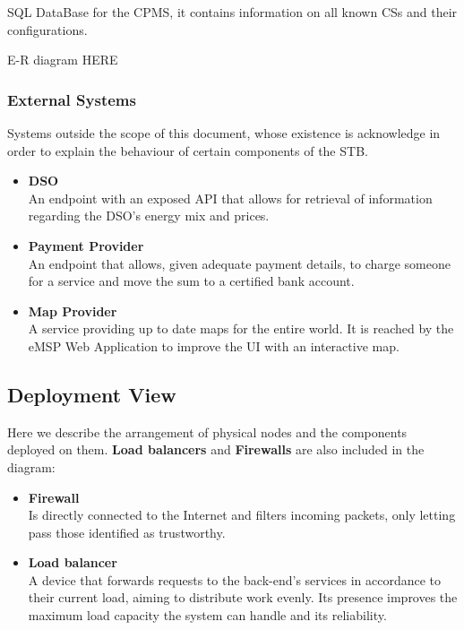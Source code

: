 \documentclass[11pt]{article}
\begin{document}
SQL DataBase for the CPMS, it contains information on all known CSs and their configurations.

E-R diagram HERE

\subsubsection{External Systems}

Systems outside the scope of this document, whose existence is acknowledge in order to explain the behaviour of certain components of the STB.

\begin{itemize}
    \item \textbf{DSO} \\
        An endpoint with an exposed API that allows for retrieval of information regarding the DSO's energy mix and prices.
    \item \textbf{Payment Provider} \\
        An endpoint that allows, given adequate payment details, to charge someone for a service and move the sum to a certified bank account.
    \item \textbf{Map Provider} \\
        A service providing up to date maps for the entire world. It is reached by the eMSP Web Application to improve the UI with an interactive map.
\end{itemize}

\subsection{Deployment View}

Here we describe the arrangement of physical nodes and the components deployed on them. \textbf{Load balancers} and \textbf{Firewalls} are also included in the diagram:
\begin{itemize}
    \item \textbf{Firewall} \\
        Is directly connected to the Internet and filters incoming packets, only letting pass those identified as trustworthy.
    \item \textbf{Load balancer} \\
        A device that forwards requests to the back-end's services in accordance to their current load, aiming to distribute work evenly. Its presence improves the maximum load capacity the system can handle and its reliability. 
\end{itemize}
\end{document}
